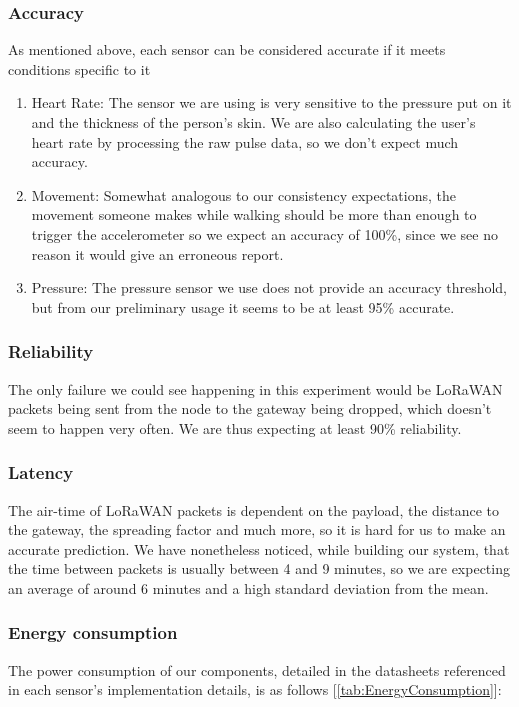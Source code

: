 		\subsubsection*{Accuracy}
			As mentioned above, each sensor can be considered accurate if it meets conditions specific to it 

			\begin{enumerate}
				\item Heart Rate: The sensor we are using is very sensitive to the pressure put on it and the thickness of the person's skin. We are also calculating the user's heart rate by processing the raw pulse data, so we don't expect much accuracy.
				\item Movement: Somewhat analogous to our consistency expectations, the movement someone makes while walking should be more than enough to trigger the accelerometer so we expect an accuracy of 100\%, since we see no reason it would give an erroneous report.
				\item Pressure: The pressure sensor we use does not provide an accuracy threshold, but from our preliminary usage it seems to be at least 95\% accurate.
			\end{enumerate}

		\subsubsection*{Reliability}
			The only failure we could see happening in this experiment would be LoRaWAN packets being sent from the node to the gateway being dropped, which doesn't seem to happen very often. We are thus expecting at least 90\% reliability. 

		\subsubsection*{Latency}
			The air-time of LoRaWAN packets is dependent on the payload, the distance to the gateway, the spreading factor and much more, so it is hard for us to make an accurate prediction. We have nonetheless noticed, while building our system, that the time between packets is usually between 4 and 9 minutes, so we are expecting an average of around 6 minutes and a high standard deviation from the mean.

		\subsubsection*{Energy consumption}
			The power consumption of our components, detailed in the datasheets referenced in each sensor's implementation details, is as follows [\ref{tab:EnergyConsumption}]:

